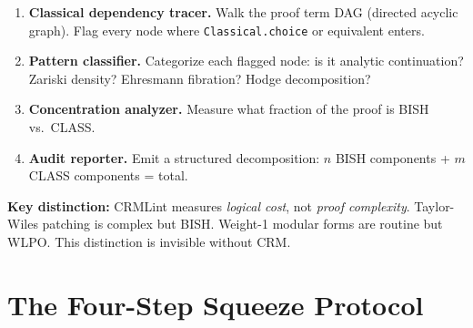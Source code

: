 \documentclass[11pt,twoside,openany]{report}
\theoremstyle{remark}
\newcommand{\BISH}{\textsf{BISH}}
\newcommand{\WLPO}{\textsf{WLPO}}
\newcommand{\CLASS}{\textsf{CLASS}}
\begin{document}
\begin{enumerate}
  \item \textbf{Classical dependency tracer.} Walk the proof term DAG (directed acyclic graph). Flag every node where \texttt{Classical.choice} or equivalent enters.
  \item \textbf{Pattern classifier.} Categorize each flagged node: is it analytic continuation? Zariski density? Ehresmann fibration? Hodge decomposition?
  \item \textbf{Concentration analyzer.} Measure what fraction of the proof is \BISH{} vs.\ \CLASS.
  \item \textbf{Audit reporter.} Emit a structured decomposition: $n$ \BISH{} components + $m$ \CLASS{} components = total.
\end{enumerate}

\textbf{Key distinction:} CRMLint measures \emph{logical cost}, not \emph{proof complexity}. Taylor-Wiles patching is complex but \BISH. Weight-1 modular forms are routine but \WLPO. This distinction is invisible without CRM.


\section{The Four-Step Squeeze Protocol}
\end{document}
